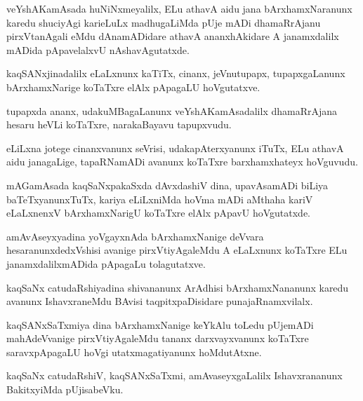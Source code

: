 \documentclass{article}
\begin{document}
\begin{mn}
veYshAKamAsada huNiNxmeyalilx, ELu athavA aidu jana bArxhamxNaranunx karedu shuciyAgi karieLuLx 
madhugaLiMda pUje mADi dhamaRrAjanu pirxVtanAgali eMdu dAnamADidare athavA ananxhAkidare A 
janamxdalilx mADida  pApavelalxvU nAshavAgutatxde.
\end{mn}

\begin{mn}
kaqSANxjinadalilx eLaLxnunx kaTiTx, cinanx, jeVnutupapx, tupapxgaLanunx bArxhamxNarige koTaTxre 
elAlx pApagaLU hoVgutatxve.
\end{mn}

\begin{mn}
tupapxda ananx, udakuMBagaLanunx veYshAKamAsadalilx dhamaRrAjana hesaru heVLi koTaTxre, 
narakaBayavu tapupxvudu.
\end{mn}

\begin{mn}
eLiLxna jotege cinanxvanunx seVrisi, udakapAterxyanunx iTuTx, ELu athavA aidu janagaLige, 
tapaRNamADi avanunx koTaTxre barxhamxhateyx hoVguvudu.
\end{mn}

\begin{mn}
mAGamAsada kaqSaNxpakaSxda dAvxdashiV dina, upavAsamADi biLiya baTeTxyanunxTuTx, kariya 
eLiLxniMda hoVma mADi aMthaha kariV eLaLxnenxV bArxhamxNarigU koTaTxre elAlx pApavU hoVgutatxde.
\end{mn}

\begin{mn}
amAvAseyxyadina yoVgayxnAda bArxhamxNanige deVvara hesaranunxdedxVshisi avanige pirxVtiyAgaleMdu A 
eLaLxnunx koTaTxre ELu janamxdalilxmADida pApagaLu tolagutatxve.
\end{mn}

\begin{mn}
kaqSaNx catudaRshiyadina shivananunx ArAdhisi bArxhamxNananunx  karedu avanunx IshavxraneMdu BAvisi
taqpitxpaDisidare punajaRnamxvilalx.
\end{mn}

\begin{mn}
kaqSANxSaTxmiya dina bArxhamxNanige keYkAlu toLedu pUjemADi mahAdeVvanige pirxVtiyAgaleMdu tananx
darxvayxvanunx koTaTxre saravxpApagaLU hoVgi utatxmagatiyanunx hoMdutAtxne.
\end{mn}

\begin{mn}
kaqSaNx catudaRshiV, kaqSANxSaTxmi, amAvaseyxgaLalilx Ishavxrananunx BakitxyiMda pUjisabeVku.
\end{mn}
\end{document}
